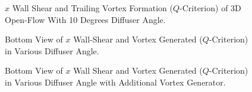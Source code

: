 \begin{figure}[!htb]
    \centering
    \noindent{}
    \caption{$x$ Wall Shear and Trailing Vortex Formation ($Q$-Criterion) of 3D Open-Flow With 10 Degrees Diffuser Angle.}
    \label{fig:3D_OF_ISO_COMPARE}
\end{figure}
\begin{figure}
    \centering
    \noindent{}
    \caption{Bottom View of $x$ Wall-Shear and Vortex Generated ($Q$-Criterion) in Various Diffuser Angle.}
    \label{fig:3D_OF_BOTTOM_VIEW_COMPARE_DIFF}
\end{figure}

\begin{figure}
    \centering
    \noindent{}
    \caption{Bottom View of $x$ Wall Shear and Vortex Generated ($Q$-Criterion) in Various Diffuser Angle with Additional Vortex Generator.}
    \label{fig:3D_OF_BOTTOM_VIEW_COMPARE_DIFF_F}
\end{figure}

